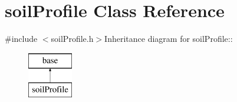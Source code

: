 \hypertarget{classsoil_profile}{
\section{soilProfile Class Reference}
\label{classsoil_profile}
}


{\ttfamily \#include $<$soilProfile.h$>$}Inheritance diagram for soilProfile::\begin{figure}[H]
\begin{center}
\leavevmode
\includegraphics[height=2cm]{classsoil_profile}
\end{center}
\end{figure}
